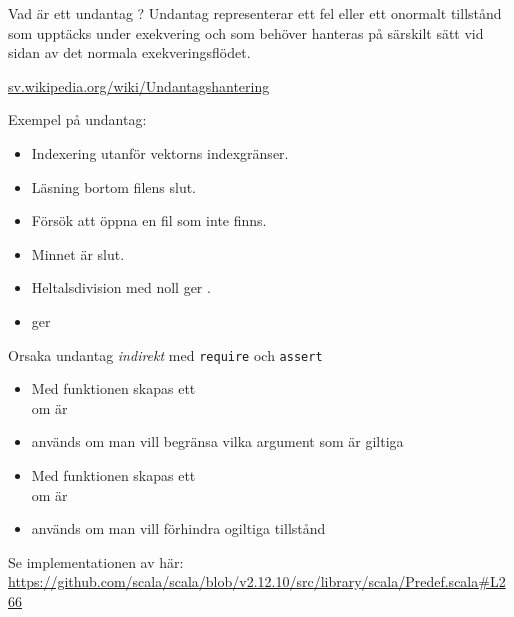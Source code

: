 



\begin{Slide}{Vad är ett undantag ?}
Undantag representerar ett fel eller ett onormalt tillstånd som upptäcks under exekvering och som  behöver hanteras på särskilt sätt vid sidan av det normala exekveringsflödet.

\vspace{1em}\href{https://sv.wikipedia.org/wiki/Undantagshantering}{sv.wikipedia.org/wiki/Undantagshantering}


\vspace{1em} Exempel på undantag:

\pause

\begin{itemize} \SlideFontSmall
\item Indexering utanför vektorns indexgränser.

\item Läsning bortom filens slut.

\item Försök att öppna en fil som inte finns.

\item Minnet är slut.

\item Heltalsdivision med noll ger .

\item {} ger 

\end{itemize}

\end{Slide}


\begin{Slide}{Orsaka undantag \textit{indirekt} med \texttt{require} och \texttt{assert}}

\begin{itemize}\SlideFontSmall
  \item Med funktionen  skapas ett  \\ om  är 
  \item {} används om man vill begränsa vilka argument som är giltiga
  \item Med funktionen  skapas ett  \\ om  är  
  \item {} används om man vill förhindra ogiltiga tillstånd
\end{itemize}
{
  \ifkompendium\else
  \vfill\SlideFontTiny
  \fi
  Se implementationen av  här:\\
\url{https://github.com/scala/scala/blob/v2.12.10/src/library/scala/Predef.scala#L266}
}
\end{Slide}

